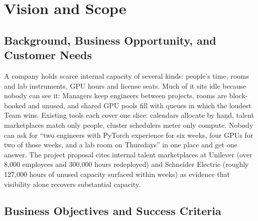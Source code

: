 \section{Vision and Scope}\label{sec:vision}

\subsection{Background, Business Opportunity, and Customer Needs}

A company holds scarce internal capacity of several kinds: people's time, rooms and lab instruments, GPU hours and license seats. Much of it sits idle because nobody can see it: Managers keep engineers between projects, rooms are block-booked and unused, and shared GPU pools fill with queues in which the loudest Team wins. Existing tools each cover one slice: calendars allocate by hand, talent marketplaces match only people, cluster schedulers meter only compute. Nobody can ask for ``two engineers with PyTorch experience for six weeks, four GPUs for two of those weeks, and a lab room on Thursdays'' in one place and get one answer. The project proposal cites internal talent marketplaces at Unilever (over 8{,}000 employees and 300{,}000 hours redeployed) and Schneider Electric (roughly 127{,}000 hours of unused capacity surfaced within weeks) as evidence that visibility alone recovers substantial capacity.

\subsection{Business Objectives and Success Criteria}



